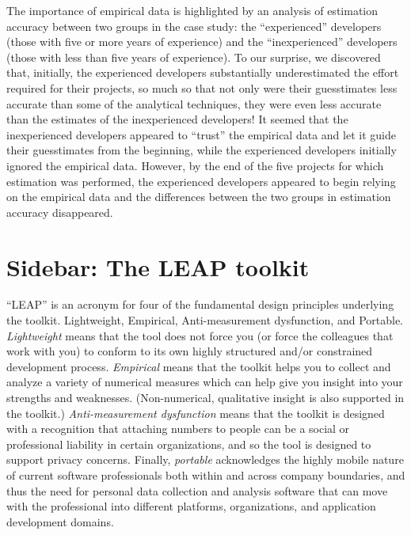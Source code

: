 \begin{enumerate}
  The importance of empirical data is highlighted by an analysis of
  estimation accuracy between two groups in the case study: the
  ``experienced'' developers (those with five or more years of experience)
  and the ``inexperienced'' developers (those with less than five years of
  experience).  To our surprise, we discovered that, initially, the
  experienced developers substantially underestimated the effort required
  for their projects, so much so that not only were their guesstimates less
  accurate than some of the analytical techniques, they were even less
  accurate than the estimates of the inexperienced developers!  It seemed
  that the inexperienced developers appeared to ``trust'' the
  empirical data and let it guide their guesstimates from the beginning, while
  the experienced developers initially ignored the empirical data.  However, by
  the end of the five projects for which estimation was performed, the
  experienced developers appeared to begin relying on the empirical data
  and the differences between the two groups in estimation accuracy
  disappeared.

\end{enumerate}


\section{Sidebar: The LEAP toolkit}

``LEAP'' is an acronym for four of the fundamental design principles
underlying the toolkit.  Lightweight, Empirical, Anti-measurement
dysfunction, and Portable.  {\em Lightweight} means that the tool does not force
you (or force the colleagues that work with you) to conform to its own highly
structured and/or constrained development process.  {\em Empirical} means that
the toolkit helps you to collect and analyze a variety of numerical
measures which can help give you insight into your strengths and
weaknesses. (Non-numerical, qualitative insight is also supported in the
toolkit.)  {\em Anti-measurement dysfunction} \cite{Austin96} means that the toolkit is
designed with a recognition that attaching numbers to people can be a
social or professional liability in certain organizations, and so the tool
is designed to support privacy concerns.  Finally, {\em portable} acknowledges
the highly mobile nature of current software professionals both within and
across company boundaries, and thus the need for personal data collection
and analysis software that can move with the professional into different
platforms, organizations, and application development domains. 

